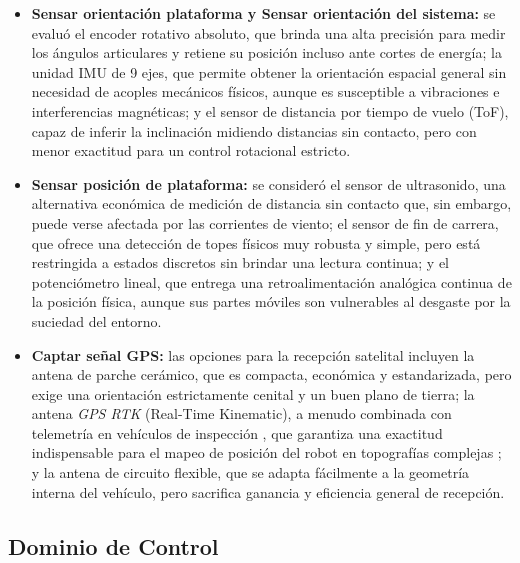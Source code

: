 \begin{itemize}
	\item \textbf{Sensar orientación plataforma y Sensar orientación del sistema:} se evaluó el encoder rotativo absoluto, que brinda una alta precisión para medir los ángulos articulares y retiene su posición incluso ante cortes de energía; la unidad IMU de 9 ejes, que permite obtener la orientación espacial general sin necesidad de acoples mecánicos físicos, aunque es susceptible a vibraciones e interferencias magnéticas; y el sensor de distancia por tiempo de vuelo (ToF), capaz de inferir la inclinación midiendo distancias sin contacto, pero con menor exactitud para un control rotacional estricto.
	
	\item \textbf{Sensar posición de plataforma:} se consideró el sensor de ultrasonido, una alternativa económica de medición de distancia sin contacto que, sin embargo, puede verse afectada por las corrientes de viento; el sensor de fin de carrera, que ofrece una detección de topes físicos muy robusta y simple, pero está restringida a estados discretos sin brindar una lectura continua; y el potenciómetro lineal, que entrega una retroalimentación analógica continua de la posición física, aunque sus partes móviles son vulnerables al desgaste por la suciedad del entorno.
	
	\item \textbf{Captar señal GPS:} las opciones para la recepción satelital incluyen la antena de parche cerámico, que es compacta, económica y estandarizada, pero exige una orientación estrictamente cenital y un buen plano de tierra; la antena \textit{GPS RTK} (Real-Time Kinematic), a menudo combinada con telemetría en vehículos de inspección \citep{CN116405876A}, que garantiza una exactitud indispensable para el mapeo de posición del robot en topografías complejas ; y la antena de circuito flexible, que se adapta fácilmente a la geometría interna del vehículo, pero sacrifica ganancia y eficiencia general de recepción.
	
\end{itemize}
\pagebreak
\subsection{Dominio de Control}

